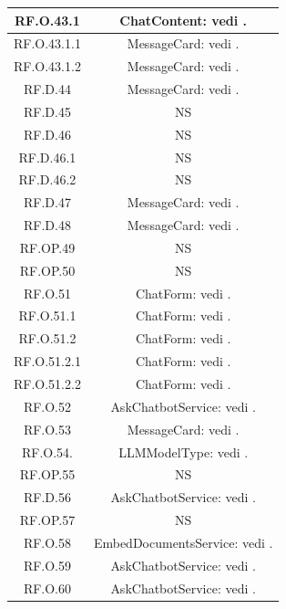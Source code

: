 \documentclass[10pt, a4paper]{article}
\begin{document}
\begin{xltabular}{\textwidth}{c|c}
\hline
RF.O.43.1 & ChatContent: vedi .\\  
\hline
RF.O.43.1.1 &  MessageCard: vedi .\\ 
\hline
RF.O.43.1.2 & MessageCard: vedi .\\
\hline
RF.D.44 & MessageCard: vedi .\\
\hline 
RF.D.45  & NS \\
\hline 
RF.D.46 & NS \\
\hline 
RF.D.46.1 & NS \\
\hline 
RF.D.46.2 & NS \\
\hline
RF.D.47 &  MessageCard: vedi .\\
\hline
RF.D.48 & MessageCard: vedi .\\
\hline
RF.OP.49  & NS \\
\hline 
RF.OP.50 & NS \\
\hline
RF.O.51 & ChatForm: vedi .\\  
\hline
RF.O.51.1 & ChatForm: vedi .\\ 
\hline
RF.O.51.2 & ChatForm: vedi . \\ 
\hline
RF.O.51.2.1 & ChatForm: vedi . \\  
\hline
RF.O.51.2.2 & ChatForm: vedi . \\
\hline
RF.O.52 &  AskChatbotService: vedi .\\
\hline
RF.O.53 & MessageCard: vedi .\\ 
\hline
RF.O.54. &  LLMModelType: vedi .  \\
\hline
RF.OP.55 & NS \\
\hline 
RF.D.56 &  AskChatbotService: vedi .\\
\hline
RF.OP.57 & NS \\%
\hline
RF.O.58 & EmbedDocumentsService: vedi .\\
\hline
RF.O.59 &  AskChatbotService: vedi .\\
\hline
RF.O.60 &  AskChatbotService: vedi .\\
\end{xltabular}
\end{document}
